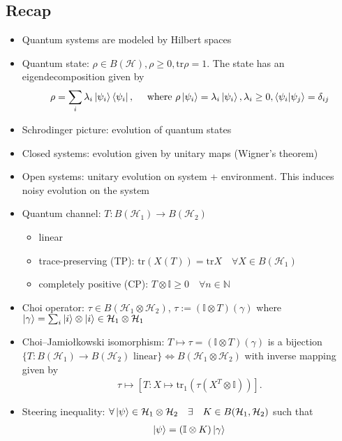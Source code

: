 \documentclass[10pt,oneside,longbibliography]{report}
\begin{document}
\subsection{Recap}
\begin{itemize}
    \item Quantum systems are modeled by Hilbert spaces
    \item Quantum state: $\rho \in B(\mathcal{H}), \rho \geq 0, \text{tr}\rho =1$. The state has an eigendecomposition given by
    \begin{align}
        \rho=\sum_i \lambda_i \ket{\psi_i}\bra{\psi_i}, \quad \text{ where } \rho \ket{\psi_i}=\lambda_i \ket{\psi_i}, \lambda_i \geq 0, \braket{\psi_i|\psi_j}=\delta_{ij}
    \end{align}
    \item Schrodinger picture: evolution of quantum states
    \item Closed systems: evolution given by unitary maps (Wigner's theorem)
    \item Open systems: unitary evolution on system + environment. This induces noisy evolution on the system
    \item Quantum channel: $T:B(\mathcal{H}_1)\rightarrow B(\mathcal{H}_2)$
    \begin{itemize}
        \item linear
        \item trace-preserving (TP): $\text{tr}(X(T)) =\text{tr}X \quad \forall X\in B(\mathcal{H}_1)$
        \item completely positive (CP): $T \otimes \mathbb{I} \geq 0 \quad \forall n\in \mathbb{N}$
    \end{itemize}
    \item Choi operator: $\tau \in B(\mathcal{H}_1\otimes \mathcal{H}_2)$, $\tau:=(\mathbb{I}\otimes T)(\gamma)$ where $\ket{\gamma} = \sum_i \ket{i} \otimes \ket{i}\in \mathcal{H}_1 \otimes \mathcal{H}_1$
    \item Choi–Jamiołkowski isomorphism: $T \mapsto \tau=(\mathbb{I}\otimes T)(\gamma)$ is a bijection $\{T:B(\mathcal{H}_1)\rightarrow B(\mathcal{H}_2) \text{ linear}\} \Leftrightarrow B(\mathcal{H}_1 \otimes \mathcal{H}_2)$ with inverse mapping given by \begin{align}
        \tau \mapsto \left[T: X \mapsto \text{tr}_1(\tau(X^T \otimes \mathbb{I}))\right].
    \end{align} 
    \item Steering inequality: $\forall \ket{\psi} \in \mathcal{H}_1 \otimes \mathcal{H}_2 \quad \exists \quad K \in B(\mathcal{H}_1, \mathcal{H}_2)$ such that 
    \begin{align}
        \ket{\psi} = (\mathbb{I} \otimes K) \ket{\gamma}
    \end{align}
\end{itemize}
\end{document}
